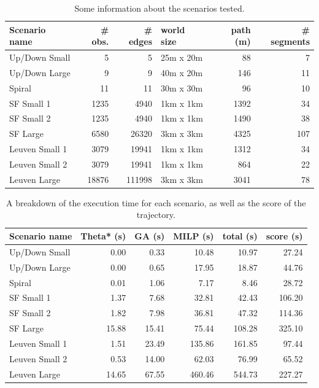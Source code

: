 \label{subsec:gen-perf}
\begin{table}[]
\centering
\begin{tabular}{ l | r | r  | l | r | r}
Scenario name & \# obs. & \# edges & world size & path (m) & \# segments \\
\hline
Up/Down Small 	& 5 	& 5 		& 25m x 20m 	& 88 	& 7   \\ 
Up/Down Large 	& 9 	& 9 		& 40m x 20m 	& 146 	& 11  \\
Spiral		 	& 11 	& 11 		& 30m x 30m 	& 96 	& 10  \\
SF Small 1		& 1235 	& 4940 		& 1km x 1km 	& 1392 	& 34  \\
SF Small 2		& 1235 	& 4940 		& 1km x 1km 	& 1490 	& 38  \\
SF Large	 	& 6580 	& 26320		& 3km x 3km 	& 4325 	& 107 \\
Leuven Small 1 	& 3079 	& 19941	 	& 1km x 1km 	& 1312 	& 34  \\
Leuven Small 2	& 3079 	& 19941		& 1km x 1km 	& 864 	& 22  \\
Leuven Large 	& 18876	& 111998 	& 3km x 3km 	& 3041 	& 78  \\
\end{tabular}
\caption{Some information about the scenarios tested.}
\label{table:gen-data}
\end{table}

\begin{table}[]
\centering
\begin{tabular}{ l | r | r | r | r || r}
Scenario name & Theta* (s) & GA (s) & MILP (s)  & total (s) & score (s) \\
\hline
Up/Down Small 	& 0.00 	& 0.33 	& 10.48 & 10.97 & 27.24	\\ 
Up/Down Large 	& 0.00 	& 0.65 	& 17.95 & 18.87 & 44.76	\\
Spiral		 	& 0.01 	& 1.06	& 7.17	& 8.46 	& 28.72	\\
SF Small 1		& 1.37 	& 7.68 	& 32.81 & 42.43 & 106.20\\
SF Small 2		& 1.82 	& 7.98	& 36.81 & 47.32 & 114.36\\
SF Large	 	& 15.88	& 15.41	& 75.44 & 108.28 & 325.10\\
Leuven Small 1 	& 1.51 	& 23.49	& 135.86& 161.85& 97.44	\\
Leuven Small 2	& 0.53 	& 14.00	& 62.03 & 76.99 & 65.52	\\
Leuven Large 	& 14.65	& 67.55	& 460.46 & 544.73 & 227.27\\
\end{tabular}
\caption{A breakdown of the execution time for each scenario, as well as the score of the trajectory.}
\label{table:gen-results}
\end{table}






